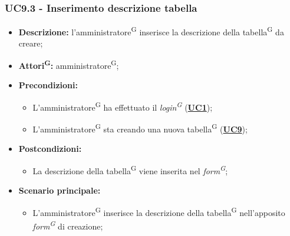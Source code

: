 \subsubsection{UC9.3 - Inserimento descrizione tabella}
\label{sec:UC9.3}
\begin{itemize}
	\item \textbf{Descrizione:} l’amministratore\textsuperscript{G} inserisce la descrizione della tabella\textsuperscript{G} da creare;
	\item \textbf{Attori\textsuperscript{G}:} amministratore\textsuperscript{G};
	\item \textbf{Precondizioni:} 
	\begin{itemize}
		\item L’amministratore\textsuperscript{G} ha effettuato il \textit{login\textsuperscript{G}} (\hyperref[sec:UC1]{\textbf{UC1}});
		\item L’amministratore\textsuperscript{G} sta creando una nuova tabella\textsuperscript{G} (\hyperref[sec:UC9]{\textbf{UC9}});
	\end{itemize}
	\item \textbf{Postcondizioni:} 
	\begin{itemize}
		\item La descrizione della tabella\textsuperscript{G} viene inserita nel \textit{form\textsuperscript{G}};
	\end{itemize}
	\item \textbf{Scenario principale:} 
	\begin{itemize}
		\item L’amministratore\textsuperscript{G} inserisce la descrizione della tabella\textsuperscript{G} nell'apposito \textit{form\textsuperscript{G}} di creazione;
	\end{itemize}
\end{itemize}

